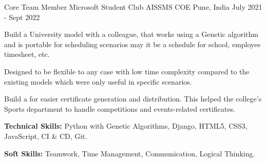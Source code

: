 \begin{cventries}
  \cventry
    {Core Team Member Microsoft Student Club} %
    {AISSMS COE} %
    {Pune, India} %
    {July 2021 - Sept 2022} %
    {
      \begin{cvitems} %
        \item {Build a University  model with a colleague, that works using a Genetic algorithm and is portable for scheduling scenarios may it be a schedule for school, employee timesheet, etc.}
        \item {Designed to be flexible to any case with low time complexity compared to the existing models which were only useful in specific scenarios.}
        \item {Build a  for easier certificate generation and distribution. This helped the college's Sports department to handle competitions and events-related certificates.}
        \item {\textbf{Technical Skills:} Python with Genetic Algorithms, Django, HTML5, CSS3, JavaScript, CI \& CD, Git.}
        \item {\textbf{Soft Skills:} Teamwork, Time Management, Communication, Logical Thinking.}
      \end{cvitems}
    }

\end{cventries}
